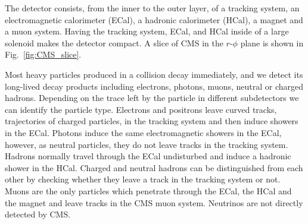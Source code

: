 The detector consists, from the inner to the outer layer,  of a tracking system, an electromagnetic calorimeter (ECal), a hadronic calorimeter (HCal), a magnet and a muon system. Having the tracking system, ECal, and HCal inside of a large solenoid makes the detector compact. A slice of CMS in the $r$-$\phi$ plane is shown in Fig.~\ref{fig:CMS_slice}.

Most heavy particles produced in a collision decay immediately, and we detect its long-lived decay products including electrons, photons, muons, neutral or charged hadrons. Depending on the trace left by the particle in different subdetectors we can identify the particle type. Electrons and positrons leave curved tracks, trajectories of charged particles, in the tracking system and then induce showers in the ECal. Photons induce the same electromagnetic showers in the ECal, however, as neutral particles, they do not leave tracks in the tracking system. Hadrons normally travel through the ECal undisturbed and induce a hadronic shower in the HCal. Charged and neutral hadrons can be distinguished from each other by checking whether they leave a track in the tracking system or not. Muons are the only particles which penetrate through the ECal, the HCal and the magnet and leave tracks in the CMS muon system. Neutrinos are not directly detected by CMS.   

